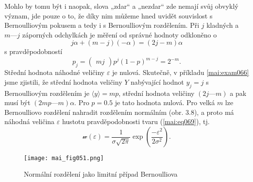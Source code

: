       Mohlo by tomu být i naopak, slova „zdar“ a „nezdar“ zde nemají svůj obvyklý význam, jde
      pouze o to, že díky nim můžeme hned uvidět souvislost s Bernoulliovým pokusem a tedy
      i s Bernoulliovým rozdělením. Při \(j\) kladných a \(m — j\) záporných odchylkách je měření od
      správné hodnoty odkloněno o
      \begin{equation*}
        j\alpha + (m - j)(-\alpha) = (2j - m)\alpha
      \end{equation*}
      s pravděpodobností
      \begin{equation*}
        p_j = \begin{pmatrix}m j\end{pmatrix}p^j(1 - p)^{m - j} = 2^{-m}.
      \end{equation*}
      Střední hodnota náhodné veličiny \(\varepsilon\) je nulová. Skutečně, v příkladu 
      \ref{mai:exam066} jsme zjistili, že střední hodnota veličiny \(Y\) nabývající hodnot \(y_j = 
      j\) s Bernoulliovým rozdělením je \(\langle y \rangle = mp\), střední hodnota veličiny \((2j 
      — m)\) a pak musí být \((2mp — m)\alpha\). Pro \(p = \num{0.5}\) je tato hodnota nulová.
      Pro velká \(m\) lze Bernoulliovo rozdělení nahradit rozdělením normálním (obr. 3.8), a proto 
      má náhodná veličina \(\varepsilon\) hustotu pravděpodobnosti tvaru (\ref{mai:eq069}), tj.
      \begin{equation*}
        \mathcal{w}(\varepsilon) = 
        \dfrac{1}{\sigma\sqrt{2\pi}}\exp\left(\dfrac{-\varepsilon^2}{2\sigma^2}\right).   
      \end{equation*}
      \begin{figure}[ht!] %
        \centering
        \texttt{[image: mai\_fig051.png]}
        \caption{Normální rozdělení jako limitní případ Bernoulliova 
        \cite[s.~256]{Musilova2009MA1}}
        \label{mai:fig051}
      \end{figure}
      
